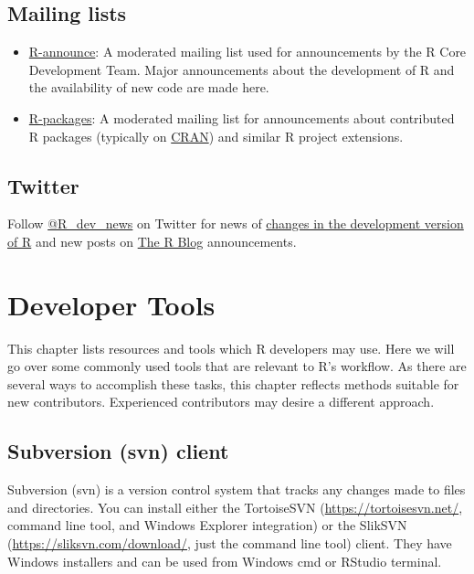 \documentclass[
]{book}
\providecommand{\tightlist}{%
  \setlength{\itemsep}{0pt}\setlength{\parskip}{0pt}}
\begin{document}
\hypertarget{mailing-lists-1}{%
\section{Mailing lists}\label{mailing-lists-1}}

\begin{itemize}
\tightlist
\item
  \href{https://stat.ethz.ch/mailman/listinfo/r-announce}{R-announce}: A moderated mailing list used for announcements by the R Core Development Team. Major announcements about the development of R and the availability of new code are made here.
\item
  \href{https://stat.ethz.ch/mailman/listinfo/r-packages}{R-packages}: A moderated mailing list for announcements about contributed R packages (typically on \href{https://cran.r-project.org/}{CRAN}) and similar R project extensions.
\end{itemize}

\hypertarget{twitter}{%
\section{Twitter}\label{twitter}}

Follow \href{https://twitter.com/R_dev_news}{@R\_dev\_news} on Twitter for news of \href{https://developer.r-project.org/RSSfeeds.html}{changes in the development version of R} and new posts on \href{https://blog.r-project.org/}{The R Blog} announcements.

\hypertarget{DevTools}{%
\chapter{Developer Tools}\label{DevTools}}

This chapter lists resources and tools which R developers may use. Here we will go over some commonly used tools that are relevant to R's workflow. As there are several ways to accomplish these tasks, this chapter reflects methods suitable for new contributors. Experienced contributors may desire a different approach.

\hypertarget{subversion-svn-client}{%
\section{Subversion (svn) client}\label{subversion-svn-client}}

Subversion (svn) is a version control system that tracks any changes made to files and directories. You can install either the TortoiseSVN (\url{https://tortoisesvn.net/}, command line tool, and Windows Explorer integration) or the SlikSVN (\url{https://sliksvn.com/download/}, just the command line tool) client. They have Windows installers and can be used from Windows cmd or RStudio terminal.
\end{document}
